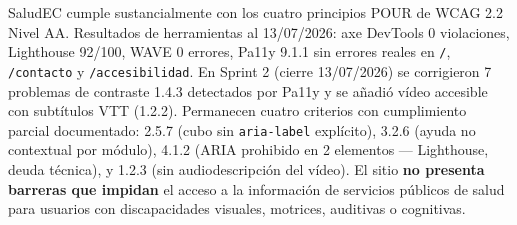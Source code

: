 \documentclass[12pt, a4paper]{article}
\begin{document}
\begin{okbox}
SaludEC cumple sustancialmente con los cuatro principios POUR de WCAG 2.2 Nivel AA. Resultados de herramientas al 13/07/2026: axe DevTools 0 violaciones, Lighthouse 92/100, WAVE 0 errores, Pa11y 9.1.1 sin errores reales en \texttt{/}, \texttt{/contacto} y \texttt{/accesibilidad}. En Sprint 2 (cierre 13/07/2026) se corrigieron 7 problemas de contraste 1.4.3 detectados por Pa11y y se añadió vídeo accesible con subtítulos VTT (1.2.2). Permanecen cuatro criterios con cumplimiento parcial documentado: 2.5.7 (cubo sin \texttt{aria-label} explícito), 3.2.6 (ayuda no contextual por módulo), 4.1.2 (ARIA prohibido en 2 elementos --- Lighthouse, deuda técnica), y 1.2.3 (sin audiodescripción del vídeo). El sitio \textbf{no presenta barreras que impidan} el acceso a la información de servicios públicos de salud para usuarios con discapacidades visuales, motrices, auditivas o cognitivas.
\end{okbox}
\end{document}
